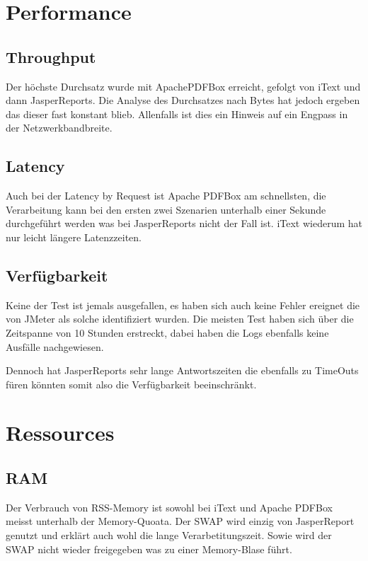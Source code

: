 \documentclass[main.tex]{subfiles}
\begin{document}
\section{Performance}



\subsection{Throughput}

Der höchste Durchsatz wurde mit ApachePDFBox erreicht, gefolgt von iText und dann JasperReports. Die Analyse des Durchsatzes nach Bytes hat jedoch ergeben das dieser fast konstant blieb. Allenfalls ist dies ein Hinweis auf ein Engpass in der Netzwerkbandbreite. 

\subsection{Latency}
Auch bei der Latency by Request ist Apache PDFBox am schnellsten, die Verarbeitung kann bei den ersten zwei Szenarien unterhalb einer Sekunde durchgeführt werden was bei JasperReports nicht der Fall ist. iText wiederum hat nur leicht längere Latenzzeiten. 

\subsection{Verfügbarkeit}

Keine der Test ist jemals ausgefallen, es haben sich auch keine Fehler ereignet die von JMeter als solche identifiziert wurden.
Die meisten Test haben sich über die Zeitspanne von 10 Stunden erstreckt, dabei haben  die Logs ebenfalls keine Ausfälle nachgewiesen. 

Dennoch hat JasperReports sehr lange Antwortszeiten die ebenfalls zu TimeOuts füren könnten somit also die Verfügbarkeit beeinschränkt.

\section{Ressources}

\subsection{RAM}
Der Verbrauch von RSS-Memory ist sowohl bei iText und Apache PDFBox meisst unterhalb der Memory-Quoata. Der SWAP wird einzig von JasperReport genutzt und erklärt auch wohl die lange Verarbetitungszeit. Sowie wird der SWAP nicht wieder freigegeben was zu einer Memory-Blase führt. 
\end{document}
